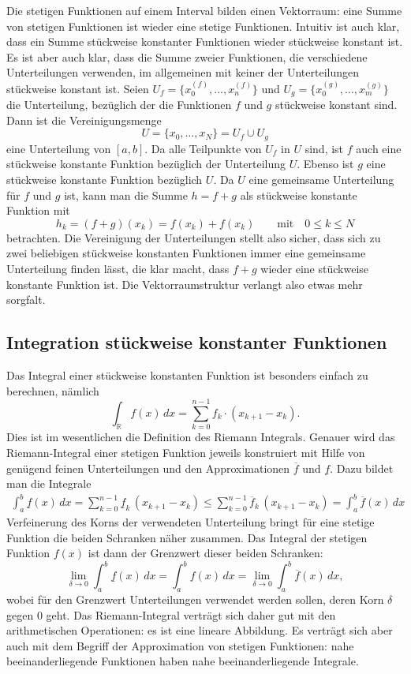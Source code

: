 Die stetigen Funktionen auf einem Interval bilden einen Vektorraum: eine
Summe von stetigen Funktionen ist wieder eine stetige Funktionen.
Intuitiv ist auch klar, dass ein Summe stückweise konstanter Funktionen
wieder stückweise konstant ist.
Es ist aber auch klar, dass die Summe zweier Funktionen, die verschiedene
Unterteilungen verwenden, im allgemeinen mit keiner der Unterteilungen
stückweise konstant ist.
Seien $U_f=\{x_0^{(f)},\dots,x_n^{(f)}\}$ und
$U_g=\{x_0^{(g)},\dots,x_m^{(g)}\}$ die Unterteilung, bezüglich der 
die Funktionen $f$ und $g$ stückweise konstant sind.
Dann ist die Vereinigungsmenge
\[
U= \{x_0,\dots,x_N\} = U_f\cup U_g
\]
eine Unterteilung von $[a,b]$.
Da alle Teilpunkte von $U_f$ in $U$ sind, ist $f$ auch eine stückweise
konstante Funktion bezüglich der Unterteilung $U$. 
Ebenso ist $g$ eine stückweise konstante Funktion bezüglich $U$.
Da $U$ eine gemeinsame Unterteilung für $f$ und $g$ ist, kann man
die Summe $h=f+g$ als stückweise konstante Funktion mit
\[
h_k
=
(f+g)(x_k)
= 
f(x_k) + f(x_k)
\qquad\text{mit}\quad
0\le k\le N
\]
betrachten.
Die Vereinigung der Unterteilungen stellt also sicher, dass sich
zu zwei beliebigen stückweise konstanten Funktionen immer eine
gemeinsame Unterteilung finden lässt, die klar macht, dass $f+g$
wieder eine stückweise konstante Funktion ist.
Die Vektorraumstruktur verlangt also etwas mehr sorgfalt.

\subsection{Integration stückweise konstanter Funktionen}
Das Integral einer stückweise konstanten Funktion ist besonders einfach 
zu berechnen, nämlich
\[
\int_{\mathbb R} f(x)\,dx = \sum_{k=0}^{n-1} f_k\cdot (x_{k+1}-x_k).
\]
Dies ist im wesentlichen die Definition des Riemann Integrals.
Genauer wird das Riemann-Integral einer stetigen Funktion jeweils
konstruiert mit Hilfe von genügend feinen Unterteilungen und den
Approximationen $\overline{f}$ und $\underline{f}$.
Dazu bildet man die Integrale
\begin{align*}
\int_a^b \underline{f}(x)\,dx
=
\sum_{k=0}^{n-1} \underline{f}_{k}\,(x_{k+1}-x_k)
\le
\sum_{k=0}^{n-1} \overline{f}_{k}\,(x_{k+1}-x_k)
=
\int_a^b \overline{f}(x)\,dx
\end{align*}
Verfeinerung des Korns der verwendeten Unterteilung bringt für eine
stetige Funktion die beiden Schranken näher zusammen.
Das Integral der stetigen Funktion $f(x)$ ist dann der Grenzwert
dieser beiden Schranken:
\[
\lim_{\delta\to 0}
\int_a^b \underline{f}(x)\,dx
=
\int_a^b f(x)\,dx
=
\lim_{\delta\to 0}
\int_a^b \overline{f}(x)\,dx,
\]
wobei für den Grenzwert Unterteilungen verwendet werden sollen, deren
Korn $\delta$ gegen $0$ geht.
Das Riemann-Integral verträgt sich daher gut mit den arithmetischen
Operationen: es ist eine lineare Abbildung.
Es verträgt sich aber auch mit dem Begriff der Approximation von
stetigen Funktionen: nahe beeinanderliegende Funktionen haben nahe
beeinanderliegende Integrale.

